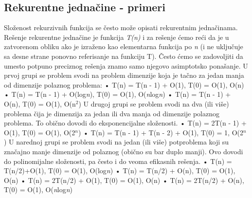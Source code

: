 \documentclass{article}
\begin{document}
\subsection{Rekurentne jednačine - primeri}
Složenost rekurzivnih funkcija se često može opisati rekurentnim jednačinama.
Rešenje rekurentne jednačine je funkcija \textit{T(n)} i za rešenje ćemo reći da je u
zatvorenom obliku ako je izraženo kao elementarna funkcija po \textit{n} (i ne uključuje
sa desne strane ponovno referisanje na funkciju T). Često ćemo se zadovoljiti da
umesto potpuno preciznog rešenja znamo samo njegovo asimptotsko ponašanje.
\newline U prvoj grupi se problem svodi na problem dimenzije koja je tačno za jedan
manja od dimenzije polaznog problema:
\newline\hspace*{0.4cm}• T(n) = T(n - 1) + O(1), T(0) = O(1), O(n)
\newline\hspace*{0.4cm}• T(n) = T(n - 1) + O(log\textit{n}), T(0) = O(1), O(\textit{n}log\textit{n})
\newline\hspace*{0.4cm}• T(n) = T(n - 1) + O(n), T(0) = O(1), 
O(n$^2$)
\newline U drugoj grupi se problem svodi na dva (ili više) problema čija je dimenzija
za jedan ili dva manja od dimenzije polaznog problema. To obično dovodi do
eksponencijalne složenosti.
\newline\hspace*{0.4cm}• T(n) = 2T(n - 1) + O(1), T(0) = O(1), O(2$^n$)
\newline\hspace*{0.4cm}• T(n) = T(n - 1) + T(n - 2) + O(1), T(0) = 1, O(2$^n$)
\newline U narednoj grupi se problem svodi na jedan (ili više) potproblema koji su
značajno manje dimenzije od polaznog (obično su bar duplo manji). Ovo dovodi
do polinomijalne složenosti, pa često i do veoma efikasnih rešenja.
\newline\hspace*{0.4cm}• T(n) = T(n/2)+O(1), T(0) = O(1), O(log\textit{n})
\newline\hspace*{0.4cm}• T(n) = T(n/2) + O(n), T(0) = O(1), O(n)
\newline\hspace*{0.4cm}• T(n) = 2T(n/2) + O(1), T(0) = O(1), O(n)
\newline\hspace*{0.4cm}• T(n) = 2T(n/2) + O(n), T(0) = O(1), O(\textit{n}log\textit{n})
\end{document}
